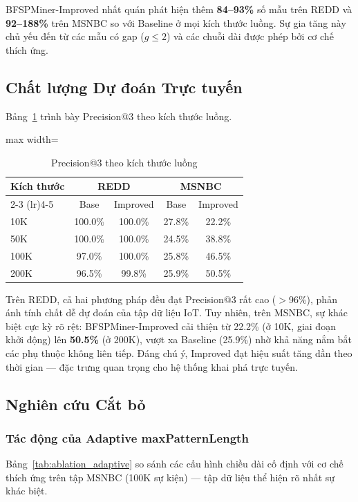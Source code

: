 \documentclass{article}
\begin{document}
BFSPMiner-Improved nhất quán phát hiện thêm \textbf{84--93\%} số mẫu trên REDD và \textbf{92--188\%} trên MSNBC so với Baseline ở mọi kích thước luồng. Sự gia tăng này chủ yếu đến từ các mẫu có gap ($g \leq 2$) và các chuỗi dài được phép bởi cơ chế thích ứng.

\subsection{Chất lượng Dự đoán Trực tuyến}
Bảng~\ref{tab:hitrate_scale} trình bày Precision@3 theo kích thước luồng.

\begin{table}[htbp]
    \centering
    \caption{Precision@3 theo kích thước luồng}
    \label{tab:hitrate_scale}
    \begin{adjustbox}{max width=\columnwidth}
\begin{tabular}{lcccc}
        \toprule
        \multirow{2}{*}{\textbf{Kích thước}} & \multicolumn{2}{c}{\textbf{REDD}} & \multicolumn{2}{c}{\textbf{MSNBC}} \\
        \cmidrule(lr){2-3} \cmidrule(lr){4-5}
         & Base & Improved & Base & Improved \\
        \midrule
        10K  & 100.0\% & 100.0\% & 27.8\% & 22.2\% \\
        50K  & 100.0\% & 100.0\% & 24.5\% & 38.8\% \\
        100K & 97.0\%  & 100.0\% & 25.8\% & 46.5\% \\
        200K & 96.5\%  & 99.8\%  & 25.9\% & 50.5\% \\
        \bottomrule
    \end{tabular}
\end{adjustbox}
\end{table}

Trên REDD, cả hai phương pháp đều đạt Precision@3 rất cao ($>$96\%), phản ánh tính chất dễ dự đoán của tập dữ liệu IoT. Tuy nhiên, trên MSNBC, sự khác biệt cực kỳ rõ rệt: BFSPMiner-Improved cải thiện từ 22.2\% (ở 10K, giai đoạn khởi động) lên \textbf{50.5\%} (ở 200K), vượt xa Baseline (25.9\%) nhờ khả năng nắm bắt các phụ thuộc không liên tiếp. Đáng chú ý, Improved đạt hiệu suất tăng dần theo thời gian --- đặc trưng quan trọng cho hệ thống khai phá trực tuyến.

\subsection{Nghiên cứu Cắt bỏ}

\subsubsection{Tác động của Adaptive maxPatternLength}
Bảng~\ref{tab:ablation_adaptive} so sánh các cấu hình chiều dài cố định với cơ chế thích ứng trên tập MSNBC (100K sự kiện) --- tập dữ liệu thể hiện rõ nhất sự khác biệt.
\end{document}
